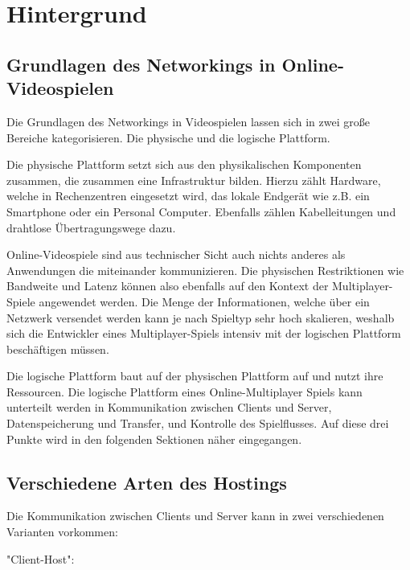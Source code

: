 
\chapter{Hintergrund}
\label{sec:hintergrund}

\section{Grundlagen des Networkings in Online-Videospielen}

Die Grundlagen des Networkings in Videospielen lassen sich in zwei große Bereiche kategorisieren. Die physische und die logische Plattform. 

Die physische Plattform setzt sich aus den physikalischen Komponenten zusammen, die zusammen eine Infrastruktur bilden. Hierzu zählt Hardware, welche in Rechenzentren eingesetzt wird, das lokale Endgerät wie z.B. ein Smartphone oder ein Personal Computer. Ebenfalls zählen Kabelleitungen und drahtlose Übertragungswege dazu. 

Online-Videospiele sind aus technischer Sicht auch nichts anderes als Anwendungen die miteinander kommunizieren. Die physischen Restriktionen wie Bandweite und Latenz können also ebenfalls auf den Kontext der Multiplayer-Spiele angewendet werden. Die Menge der Informationen, welche über ein Netzwerk versendet werden kann je nach Spieltyp sehr hoch skalieren, weshalb sich die Entwickler eines Multiplayer-Spiels intensiv mit der logischen Plattform beschäftigen müssen.

Die logische Plattform baut auf der physischen Plattform auf und nutzt ihre Ressourcen. Die logische Plattform eines Online-Multiplayer Spiels kann unterteilt werden in Kommunikation zwischen Clients und Server, Datenspeicherung und Transfer, und Kontrolle des Spielflusses. Auf diese drei Punkte wird in den folgenden Sektionen näher eingegangen.

\cite{Smed.2002c}


\section{Verschiedene Arten des Hostings}

Die Kommunikation zwischen Clients und Server kann in zwei verschiedenen Varianten vorkommen:

"Client-Host":

